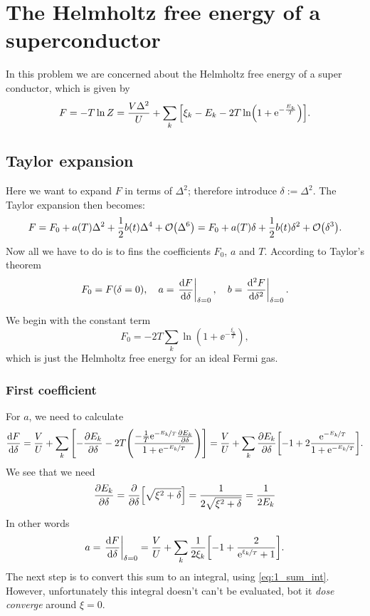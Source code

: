 \documentclass[11pt,letter, swedish, english
]{article}
\begin{document}
\section{The Helmholtz free energy of a superconductor}
\newcommand{\xD}{x_{\text{D}}}
In this problem we are concerned about the Helmholtz free energy of a
super conductor, which is given by
\begin{equation}\label{eq:2_F}
F=-T\ln{Z}=\frac{V\Delta^2}{U} + 
\sum_k\qty[\xi_k-E_k-2T\ln(1+\mathrm{e}^{-\frac{E_k}{T}})].
\end{equation}

\subsection{Taylor expansion}
Here we want to expand $F$ in terms of $\Delta^2$; therefore introduce
$\delta:=\Delta^2$. The Taylor expansion then becomes:
\begin{equation}\label{eq:2a_Taylor_F}
F=F_0+a(T)\Delta^2 + \frac{1}{2}b(t)\Delta^4+\order{\Delta^6}
=F_0+a(T)\delta + \frac{1}{2}b(t)\delta^2+\order{\delta^3}.
\end{equation}
Now all we have to do is to fins the coefficients $F_0$, $a$ and $T$. 
According to Taylor's theorem 
\begin{equation}\label{eq2a:coeff}
F_0=F(\delta=0)\qcomma
a=\eval{\dv{F}{\delta}}_{\delta=0}\qcomma
b=\eval{\dv[2]{F}{\delta}}_{\delta=0}.
\end{equation}

We begin with the constant term
\begin{equation}
F_0=-2T\sum_k\ln(1+\ee^{-\frac{\xi_k}{T}}),
\end{equation}
which is just the Helmholtz free energy for an ideal Fermi gas.

\subsubsection{First coefficient}
For $a$, we need to calculate
\begin{equation}\label{eq:2a_dF/ddelta}
\dv{F}{\delta}=\frac{V}{U}
+\sum_k\qty[-\pdv{E_k}{\delta}
-2T\qty(\frac{-\frac{1}{T}\mathrm{e}^{-\nicefrac{E_k}{T}}\pdv{E_k}{\delta}}
{1+\mathrm{e}^{-\nicefrac{E_k}{T}}})]
=\frac{V}{U}
+\sum_k\pdv{E_k}{\delta}\qty[-1
+2\frac{\mathrm{e}^{-\nicefrac{E_k}{T}}}{1+\mathrm{e}^{-\nicefrac{E_k}{T}}}].
\end{equation}
We see that we need
\begin{equation}\label{eq:2a_dEk/ddelta}
\pdv{E_k}{\delta}=\pdv{\delta}\qty[\sqrt{\xi^2+\delta}]
=\frac{1}{2\sqrt{\xi^2+\delta}}=\frac{1}{2E_k}
\end{equation}
In other words
\begin{equation}\label{eq:2a_a1}
a=\eval{\dv{F}{\delta}}_{\delta=0}
=\frac{V}{U}
+\sum_k\frac{1}{2\xi_k}\qty[-1
+\frac{2}{\ee^{\nicefrac{\xi_k}{T}}+1}].
\end{equation}
The next step is to convert this sum to an integral, using
\eqref{eq:1_sum_int}. However, unfortunately this integral doesn't can't be
evaluated, bot it \emph{dose converge} around $\xi=0$.
\end{document}
